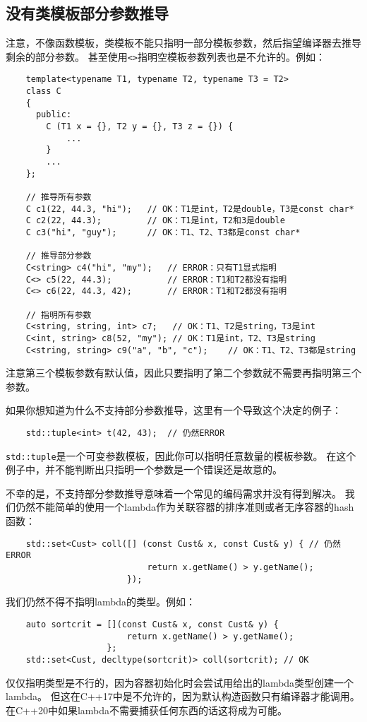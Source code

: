 \subsection{没有类模板部分参数推导}
注意，不像函数模板，类模板不能只指明一部分模板参数，然后指望编译器去推导剩余的部分参数。
甚至使用\texttt{<>}指明空模板参数列表也是不允许的。例如：
\begin{lstlisting}
    template<typename T1, typename T2, typename T3 = T2>
    class C
    {
      public:
        C (T1 x = {}, T2 y = {}, T3 z = {}) {
            ...
        }
        ...
    };

    // 推导所有参数
    C c1(22, 44.3, "hi");   // OK：T1是int，T2是double，T3是const char*
    C c2(22, 44.3);         // OK：T1是int，T2和3是double
    C c3("hi", "guy");      // OK：T1、T2、T3都是const char*

    // 推导部分参数
    C<string> c4("hi", "my");   // ERROR：只有T1显式指明
    C<> c5(22, 44.3);           // ERROR：T1和T2都没有指明
    C<> c6(22, 44.3, 42);       // ERROR：T1和T2都没有指明

    // 指明所有参数
    C<string, string, int> c7;   // OK：T1、T2是string，T3是int
    C<int, string> c8(52, "my"); // OK：T1是int，T2、T3是string
    C<string, string> c9("a", "b", "c");    // OK：T1、T2、T3都是string
\end{lstlisting}
注意第三个模板参数有默认值，因此只要指明了第二个参数就不需要再指明第三个参数。

如果你想知道为什么不支持部分参数推导，这里有一个导致这个决定的例子：
\begin{lstlisting}
    std::tuple<int> t(42, 43);  // 仍然ERROR
\end{lstlisting}
\texttt{std::tuple}是一个可变参数模板，因此你可以指明任意数量的模板参数。
在这个例子中，并不能判断出只指明一个参数是一个错误还是故意的。

不幸的是，不支持部分参数推导意味着一个常见的编码需求并没有得到解决。
我们仍然不能简单的使用一个lambda作为关联容器的排序准则或者无序容器的hash函数：
\begin{lstlisting}
    std::set<Cust> coll([] (const Cust& x, const Cust& y) { // 仍然ERROR
                            return x.getName() > y.getName();
                        });
\end{lstlisting}
我们仍然不得不指明lambda的类型。例如：
\begin{lstlisting}
    auto sortcrit = [](const Cust& x, const Cust& y) {
                        return x.getName() > y.getName();
                    };
    std::set<Cust, decltype(sortcrit)> coll(sortcrit); // OK
\end{lstlisting}
仅仅指明类型是不行的，因为容器初始化时会尝试用给出的lambda类型创建一个lambda。
但这在C++17中是不允许的，因为默认构造函数只有编译器才能调用。
在C++20中如果lambda不需要捕获任何东西的话这将成为可能。

